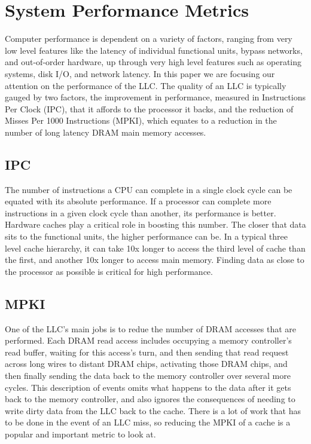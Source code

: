 \section{System Performance Metrics}

Computer performance is dependent on a variety of factors, ranging
from very low level features like the latency of individual functional units, bypass networks,
and out-of-order hardware, up through very high level features such as
operating systems, disk I/O, and network latency.  In this paper we
are focusing our attention on the performance of the LLC.  The quality
of an LLC is typically gauged by two factors, the improvement in
performance, measured in Instructions Per Clock (IPC),
that it affords to the processor it backs, and the reduction of Misses Per
1000 Instructions (MPKI), which equates to a reduction in the
number of long latency DRAM main memory accesses.

\subsection{IPC}

The number of instructions a CPU can complete in a single clock cycle
can be equated with its absolute performance.  If a processor can
complete more instructions in a given clock cycle than another,
its performance is better.  Hardware caches play a critical role in
boosting this number.  The closer that data sits to the functional
units, the higher performance can be.  In a typical three level cache
hierarchy, it can take 10x longer to access the third level of
cache than the first, and another 10x longer to access main memory.
Finding data as close to the processor as possible is critical for
high performance.

\subsection{MPKI}

One of the LLC's main jobs is to redue the number of DRAM accesses that are
performed.  Each DRAM read access includes occupying a memory
controller's read buffer, waiting for this access's turn, and then
sending that read request across long wires to distant DRAM chips,
activating those DRAM chips, and then finally sending the data back to
the memory controller over several more cycles.  This description of
events omits what happens to the data after it gets back to the memory
controller, and also ignores the consequences of needing to write
dirty data from the LLC back to the cache.  There is a lot of work
that has to be done in the event of an LLC miss, so reducing the MPKI
of a cache is a popular and important metric to look at.

